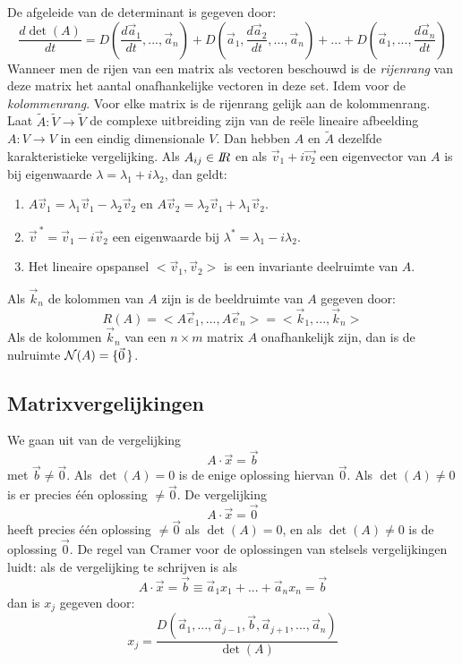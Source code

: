 \documentclass[twoside]{report}
\begin{document}
De afgeleide van de determinant is gegeven door:
\[
\frac{d\det(A)}{dt}=D(\frac{d\vec{a}_1}{dt},...,\vec{a}_n)+
D(\vec{a}_1,\frac{d\vec{a}_2}{dt},...,\vec{a}_n)+...+D(\vec{a}_1,...,\frac{d\vec{a}_n}{dt})
\]
Wanneer men de rijen van een matrix als vectoren beschouwd is de {\it rijenrang}
van deze matrix het aantal onafhankelijke vectoren in deze set. Idem voor de
{\it kolommenrang}. Voor elke matrix is de rijenrang gelijk aan de kolommenrang.
\npar
Laat $\tilde{A}:\tilde{V}\rightarrow\tilde{V}$ de complexe uitbreiding zijn van
de re\"ele lineaire afbeelding $A:V\rightarrow V$ in een eindig dimensionale
$V$. Dan hebben $A$ en $\tilde{A}$ dezelfde karakteristieke vergelijking.
\npar
Als $A_{ij}\in I\hspace{-1mm}R$ en als $\vec{v}_1+i\vec{v_2}$ een eigenvector van $A$ is
bij eigenwaarde $\lambda=\lambda_1+i\lambda_2$, dan geldt:
\begin{enumerate}
\item $A\vec{v}_1=\lambda_1\vec{v}_1-\lambda_2\vec{v}_2$ en $A\vec{v}_2=\lambda_2\vec{v}_1+\lambda_1\vec{v}_2$.
\item $\vec{v}^{~*}=\vec{v}_1-i\vec{v}_2$ een eigenwaarde bij $\lambda^*=\lambda_1-i\lambda_2$.
\item Het lineaire opspansel $<\vec{v}_1,\vec{v}_2>$ is een invariante deelruimte van $A$.
\end{enumerate}
Als $\vec{k}_n$ de kolommen van $A$ zijn is de beeldruimte van $A$ gegeven door:
\[
R(A)=<A\vec{e}_1,...,A\vec{e}_n>=<\vec{k}_1,...,\vec{k}_n>
\]
Als de kolommen $\vec{k}_n$ van een $n\times m$ matrix $A$ onafhankelijk zijn,
dan is de nulruimte ${\cal N}(A)=\{\vec{0}\,\}$.

\subsection{Matrixvergelijkingen}
We gaan uit van de vergelijking
\[
A\cdot\vec{x}=\vec{b}
\]
met $\vec{b}\neq\vec{0}$. Als $\det(A)=0$ is de enige oplossing hiervan
$\vec{0}$. Als $\det(A)\neq0$ is er precies \'e\'en oplossing $\neq\vec{0}$.
\npar
De vergelijking
\[
A\cdot\vec{x}=\vec{0}
\]
heeft precies \'e\'en oplossing $\neq\vec{0}$ als $\det(A)=0$, en als
$\det(A)\neq0$ is de oplossing $\vec{0}$.
\npar
De regel van Cramer voor de oplossingen van stelsels vergelijkingen luidt:
als de vergelijking te schrijven is als
\[
A\cdot\vec{x}=\vec{b}\equiv \vec{a}_1x_1+...+\vec{a}_nx_n=\vec{b}
\]
dan is $x_j$ gegeven door:
\[
x_j=\frac{D(\vec{a}_1,...,\vec{a}_{j-1},\vec{b},\vec{a}_{j+1},...,\vec{a}_n)}{\det(A)}
\]
\end{document}
